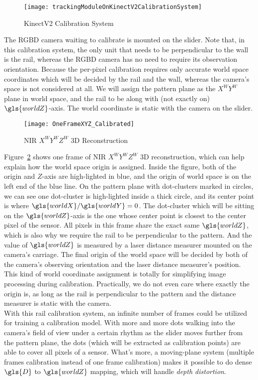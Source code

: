 %
\begin{figure}[t]
\centering
\texttt{[image: trackingModuleOnKinectV2CalibrationSystem]}
\caption{\gls{KinectV2} Calibration System}
\label{trackingModuleOnKinectV2CalibrationSystemCh3}
\end{figure}%
%
The \gls{RGBD} camera waiting to calibrate is mounted on the slider. Note that, in this calibration system, the only unit that needs to be perpendicular to the wall is the rail, whereas the \gls{RGBD} camera has no need to require its observation orientation. Because the per-pixel calibration requires only accurate world space coordinates which will be decided by the rail and the wall, whereas the camera's space is not considered at all. We will assign the pattern plane as the \(X^WY^W\) plane in world space, and the rail to be along with (not exactly on) \(\gls{worldZ}\)-axis. The world coordinate is static with the camera on the slider. %
%
%
\\\indent
\begin{figure}[!t]
\centering
\texttt{[image: OneFrameXYZ\_Calibrated]}
\caption{\gls{NIR} \(X^{W}Y^{W}Z^{W}\) \gls{3D} Reconstruction}
\label{OneFrameXYZ_Calibrated}
\end{figure}%
%
Figure~\ref{OneFrameXYZ_Calibrated} shows one frame of \gls{NIR} \(X^WY^WZ^W\) \gls{3D} reconstruction, which can help explain how the world space origin is assigned. Inside the figure, both of the origin and \(Z\)-axis are high-lighted in blue, and the origin of world space is on the left end of the blue line. On the pattern plane with dot-clusters marked in circles, we can see one dot-cluster is high-lighted inside a thick circle, and its center point is where \(\gls{worldX}/\gls{worldY} = 0\). The dot-cluster which will be sitting on the \(\gls{worldZ}\)-axis is the one whose center point is closest to the center pixel of the sensor. All pixels in this frame share the exact same \(\gls{worldZ}\), which is also why we require the rail to be perpendicular to the pattern. And the value of \(\gls{worldZ}\) is measured by a laser distance measurer mounted on the camera's carriage. The final origin of the world space will be decided by both of the camera's observing orientation and the laser distance measurer's position. This kind of world coordinate assignment is totally for simplifying image processing during calibration.  Practically, we do not even care where exactly the origin is, as long as the rail is perpendicular to the pattern and the distance measurer is static with the camera.
\\\indent
With this rail calibration system, an infinite number of frames could be utilized for training a calibration model. With more and more dots walking into the camera's field of view under a certain rhythm as the slider moves further from the pattern plane, the dots (which will be extracted as calibration points) are able to cover all pixels of a sensor. What's more, a moving-plane system (multiple frames calibration instead of one frame calibration) makes it possible to do dense \(\gls{D}\) to \(\gls{worldZ}\) mapping, which will handle \emph{depth distortion}.


